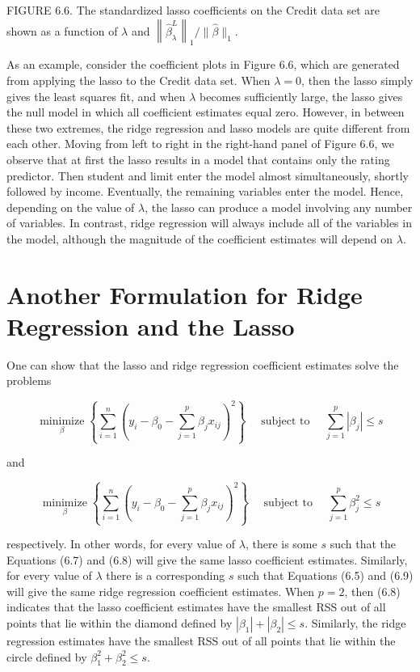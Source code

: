 \documentclass[10pt]{article}
\begin{document}
FIGURE 6.6. The standardized lasso coefficients on the Credit data set are shown as a function of $\lambda$ and $\left\|\hat{\beta}_{\lambda}^{L}\right\|_{1} /\|\hat{\beta}\|_{1}$.

As an example, consider the coefficient plots in Figure 6.6, which are generated from applying the lasso to the Credit data set. When $\lambda=0$, then the lasso simply gives the least squares fit, and when $\lambda$ becomes sufficiently large, the lasso gives the null model in which all coefficient estimates equal zero. However, in between these two extremes, the ridge regression and lasso models are quite different from each other. Moving from left to right in the right-hand panel of Figure 6.6, we observe that at first the lasso results in a model that contains only the rating predictor. Then student and limit enter the model almost simultaneously, shortly followed by income. Eventually, the remaining variables enter the model. Hence, depending on the value of $\lambda$, the lasso can produce a model involving any number of variables. In contrast, ridge regression will always include all of the variables in the model, although the magnitude of the coefficient estimates will depend on $\lambda$.

\section*{Another Formulation for Ridge Regression and the Lasso}
One can show that the lasso and ridge regression coefficient estimates solve the problems


\begin{equation*}
\underset{\beta}{\operatorname{minimize}}\left\{\sum_{i=1}^{n}\left(y_{i}-\beta_{0}-\sum_{j=1}^{p} \beta_{j} x_{i j}\right)^{2}\right\} \quad \text { subject to } \quad \sum_{j=1}^{p}\left|\beta_{j}\right| \leq s \tag{6.8}
\end{equation*}


and


\begin{equation*}
\underset{\beta}{\operatorname{minimize}}\left\{\sum_{i=1}^{n}\left(y_{i}-\beta_{0}-\sum_{j=1}^{p} \beta_{j} x_{i j}\right)^{2}\right\} \quad \text { subject to } \quad \sum_{j=1}^{p} \beta_{j}^{2} \leq s \tag{6.9}
\end{equation*}


respectively. In other words, for every value of $\lambda$, there is some $s$ such that the Equations (6.7) and (6.8) will give the same lasso coefficient estimates. Similarly, for every value of $\lambda$ there is a corresponding $s$ such that Equations (6.5) and (6.9) will give the same ridge regression coefficient estimates. When $p=2$, then (6.8) indicates that the lasso coefficient estimates have the smallest RSS out of all points that lie within the diamond defined by $\left|\beta_{1}\right|+\left|\beta_{2}\right| \leq s$. Similarly, the ridge regression estimates have the smallest RSS out of all points that lie within the circle defined by $\beta_{1}^{2}+\beta_{2}^{2} \leq s$.
\end{document}
